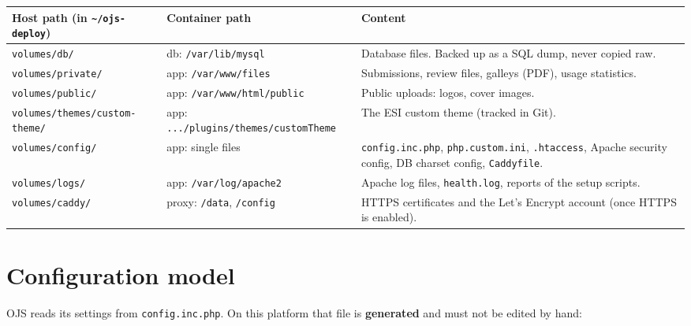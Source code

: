 \documentclass[11pt,a4paper]{report}
\newcommand{\file}[1]{\texttt{\small #1}}
\begin{document}
\begin{tabularx}{\linewidth}{@{}P{5.3cm}P{5.7cm}L@{}}
\toprule
\textbf{Host path (in \file{\textasciitilde/ojs-deploy})} & \textbf{Container path} & \textbf{Content} \\
\midrule
\file{volumes/db/}            & db: \file{/var/lib/mysql}          & Database files. Backed up as a SQL dump, never copied raw. \\
\file{volumes/private/}       & app: \file{/var/www/files}         & Submissions, review files, galleys (PDF), usage statistics. \\
\file{volumes/public/}        & app: \file{/var/www/html/public}   & Public uploads: logos, cover images. \\
\file{volumes/themes/custom-theme/} & app: \file{.../plugins/themes/customTheme} & The ESI custom theme (tracked in Git). \\
\file{volumes/config/}        & app: single files                  & \file{config.inc.php}, \file{php.custom.ini}, \file{.htaccess}, Apache security config, DB charset config, \file{Caddyfile}. \\
\file{volumes/logs/}          & app: \file{/var/log/apache2}       & Apache log files, \file{health.log}, reports of the setup scripts. \\
\file{volumes/caddy/}         & proxy: \file{/data}, \file{/config} & HTTPS certificates and the Let's Encrypt account (once HTTPS is enabled). \\
\bottomrule
\end{tabularx}

\section{Configuration model}\label{sec:configmodel}
OJS reads its settings from \file{config.inc.php}. On this platform that file is
\textbf{generated} and must not be edited by hand:

\begin{center}
\end{center}
\end{document}

